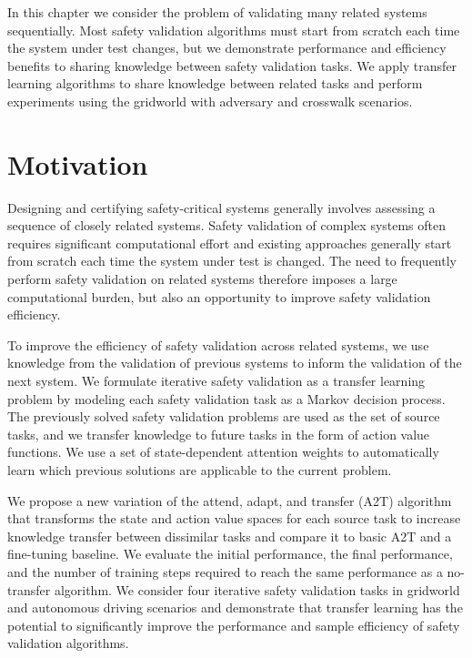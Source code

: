 In this chapter we consider the problem of validating many related systems sequentially. Most safety validation algorithms must start from scratch each time the system under test changes, but we demonstrate performance and efficiency benefits to sharing knowledge between safety validation tasks. We apply transfer learning algorithms to share knowledge between related tasks and perform experiments using the gridworld with adversary and crosswalk scenarios.

\section{Motivation}
Designing and certifying safety-critical systems generally involves assessing a sequence of closely related systems. Safety validation of complex systems often requires significant computational effort and existing approaches generally start from scratch each time the system under test is changed. The need to frequently perform safety validation on related systems therefore imposes a large computational burden, but also an opportunity to improve safety validation efficiency. 

To improve the efficiency of safety validation across related systems, we use knowledge from the validation of previous systems to inform the validation of the next system. We formulate iterative safety validation as a transfer learning problem by modeling each safety validation task as a Markov decision process. The previously solved safety validation problems are used as the set of source tasks, and we transfer knowledge to future tasks in the form of action value functions. We use a set of state-dependent attention weights to automatically learn which previous solutions are applicable to the current problem.

We propose a new variation of the attend, adapt, and transfer (A2T) algorithm~\cite{rajendran2017attend} that transforms the state and action value spaces for each source task to increase knowledge transfer between dissimilar tasks and compare it to basic A2T and a fine-tuning baseline. We evaluate the initial performance, the final performance, and the number of training steps required to reach the same performance as a no-transfer algorithm. We consider four iterative safety validation tasks in gridworld and autonomous driving scenarios and demonstrate that transfer learning has the potential to significantly improve the performance and sample efficiency of safety validation algorithms.


